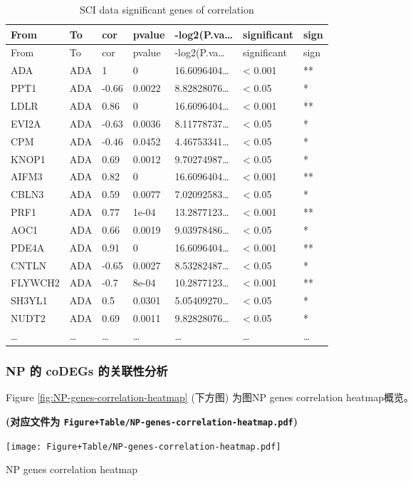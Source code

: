 \documentclass[
]{article}
\begin{document}
\begin{longtable}[]{@{}lllllll@{}}
\caption{\label{tab:SCI-data-significant-genes-of-correlation}SCI data significant genes of correlation}\tabularnewline
\toprule
From & To & cor & pvalue & -log2(P.va\ldots{} & significant & sign\tabularnewline
\midrule
\endfirsthead
\toprule
From & To & cor & pvalue & -log2(P.va\ldots{} & significant & sign\tabularnewline
\midrule
\endhead
ADA & ADA & 1 & 0 & 16.6096404\ldots{} & \textless{} 0.001 & **\tabularnewline
PPT1 & ADA & -0.66 & 0.0022 & 8.82828076\ldots{} & \textless{} 0.05 & *\tabularnewline
LDLR & ADA & 0.86 & 0 & 16.6096404\ldots{} & \textless{} 0.001 & **\tabularnewline
EVI2A & ADA & -0.63 & 0.0036 & 8.11778737\ldots{} & \textless{} 0.05 & *\tabularnewline
CPM & ADA & -0.46 & 0.0452 & 4.46753341\ldots{} & \textless{} 0.05 & *\tabularnewline
KNOP1 & ADA & 0.69 & 0.0012 & 9.70274987\ldots{} & \textless{} 0.05 & *\tabularnewline
AIFM3 & ADA & 0.82 & 0 & 16.6096404\ldots{} & \textless{} 0.001 & **\tabularnewline
CBLN3 & ADA & 0.59 & 0.0077 & 7.02092583\ldots{} & \textless{} 0.05 & *\tabularnewline
PRF1 & ADA & 0.77 & 1e-04 & 13.2877123\ldots{} & \textless{} 0.001 & **\tabularnewline
AOC1 & ADA & 0.66 & 0.0019 & 9.03978486\ldots{} & \textless{} 0.05 & *\tabularnewline
PDE4A & ADA & 0.91 & 0 & 16.6096404\ldots{} & \textless{} 0.001 & **\tabularnewline
CNTLN & ADA & -0.65 & 0.0027 & 8.53282487\ldots{} & \textless{} 0.05 & *\tabularnewline
FLYWCH2 & ADA & -0.7 & 8e-04 & 10.2877123\ldots{} & \textless{} 0.001 & **\tabularnewline
SH3YL1 & ADA & 0.5 & 0.0301 & 5.05409270\ldots{} & \textless{} 0.05 & *\tabularnewline
NUDT2 & ADA & 0.69 & 0.0011 & 9.82828076\ldots{} & \textless{} 0.05 & *\tabularnewline
\ldots{} & \ldots{} & \ldots{} & \ldots{} & \ldots{} & \ldots{} & \ldots{}\tabularnewline
\bottomrule
\end{longtable}

\hypertarget{np-ux7684-codegs-ux7684ux5173ux8054ux6027ux5206ux6790}{%
\subsubsection{NP 的 coDEGs 的关联性分析}\label{np-ux7684-codegs-ux7684ux5173ux8054ux6027ux5206ux6790}}

Figure \ref{fig:NP-genes-correlation-heatmap} (下方图) 为图NP genes correlation heatmap概览。

\textbf{(对应文件为 \texttt{Figure+Table/NP-genes-correlation-heatmap.pdf})}

\def\@captype{figure}
\begin{center}
\texttt{[image: Figure+Table/NP-genes-correlation-heatmap.pdf]}
\caption{NP genes correlation heatmap}\label{fig:NP-genes-correlation-heatmap}
\end{center}
\end{document}
